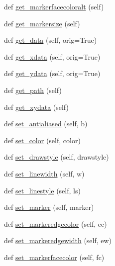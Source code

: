 \begin{DoxyCompactItemize}
def \hyperlink{classmatplotlib_1_1lines_1_1Line2D_a86642aae4e7a0e982b240c2ba24133a1}{get\+\_\+markerfacecoloralt} (self)
\item 
def \hyperlink{classmatplotlib_1_1lines_1_1Line2D_ae09ec84404b7788ddd8c8cd8ff6e2596}{get\+\_\+markersize} (self)
\item 
def \hyperlink{classmatplotlib_1_1lines_1_1Line2D_a841568ce9e6351d3687793c4d6f868e1}{get\+\_\+data} (self, orig=True)
\item 
def \hyperlink{classmatplotlib_1_1lines_1_1Line2D_a496840f5c427be76b434fa2ab0ab97a3}{get\+\_\+xdata} (self, orig=True)
\item 
def \hyperlink{classmatplotlib_1_1lines_1_1Line2D_a3ceae989db6514d08c16bec8633afc67}{get\+\_\+ydata} (self, orig=True)
\item 
def \hyperlink{classmatplotlib_1_1lines_1_1Line2D_ae54715e4e7268bf14b08ef861e26965e}{get\+\_\+path} (self)
\item 
def \hyperlink{classmatplotlib_1_1lines_1_1Line2D_a38564d2c69c10aa106899a6bee593ea4}{get\+\_\+xydata} (self)
\item 
def \hyperlink{classmatplotlib_1_1lines_1_1Line2D_a006b84b5ce10f2b7b554be686bbee9b1}{set\+\_\+antialiased} (self, b)
\item 
def \hyperlink{classmatplotlib_1_1lines_1_1Line2D_a407ee188db2fc879e53362240425ef4a}{set\+\_\+color} (self, color)
\item 
def \hyperlink{classmatplotlib_1_1lines_1_1Line2D_aa8b64c52b0e0b440e196cbc2ed432b79}{set\+\_\+drawstyle} (self, drawstyle)
\item 
def \hyperlink{classmatplotlib_1_1lines_1_1Line2D_ada4b6bcbe52d7dc7edba8b1d06ff3a97}{set\+\_\+linewidth} (self, w)
\item 
def \hyperlink{classmatplotlib_1_1lines_1_1Line2D_a1f2011724037e2286115e84210c22cdb}{set\+\_\+linestyle} (self, ls)
\item 
def \hyperlink{classmatplotlib_1_1lines_1_1Line2D_a42df9f05232a27c6c066a80ff10e5a54}{set\+\_\+marker} (self, marker)
\item 
def \hyperlink{classmatplotlib_1_1lines_1_1Line2D_ae82deaad7ca54c875d74ec46da8fd50e}{set\+\_\+markeredgecolor} (self, ec)
\item 
def \hyperlink{classmatplotlib_1_1lines_1_1Line2D_a850f2858aaf262795c68957e69d8dbc7}{set\+\_\+markeredgewidth} (self, ew)
\item 
def \hyperlink{classmatplotlib_1_1lines_1_1Line2D_af321f29912420994752574b83de7ef87}{set\+\_\+markerfacecolor} (self, fc)
\item 

\end{DoxyCompactItemize}
